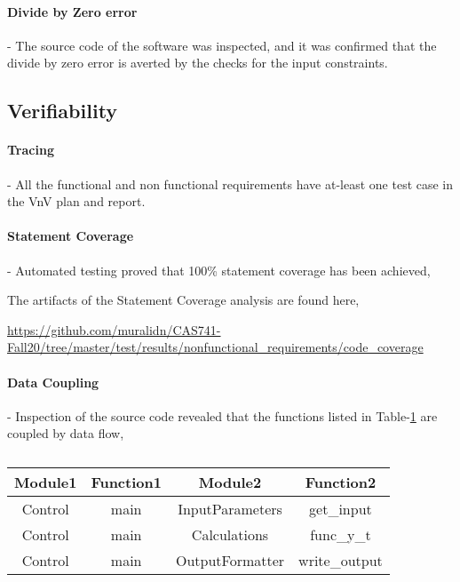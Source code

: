 \documentclass[12pt, titlepage]{article}
\begin{document}
\paragraph{Divide by Zero error} - The source code of the \progname{} software was 
inspected, and it was confirmed that the divide by zero error is averted by the checks for the 
input constraints.

\subsection{Verifiability}

\paragraph{Tracing} - All the functional and non functional requirements have at-least 
one test case in the VnV plan and report.

\paragraph{Statement Coverage} - Automated testing proved that 100\% statement
coverage has been achieved,

The artifacts of the Statement Coverage analysis are found here,

 \url{https://github.com/muralidn/CAS741-Fall20/tree/master/test/results/nonfunctional_requirements/code_coverage}

\paragraph{Data Coupling} - Inspection of the source code revealed that the functions listed in Table-\ref{tab:dataCoupling} 
are coupled by data flow,

\begin{table}[]
\caption{}
\label{tab:dataCoupling}
\begin{tabular}{c|c|c|c}
\multicolumn{1}{c|}{Module1} & \multicolumn{1}{c|}{Function1} & Module2         & Function2     \\ \hline
Control                      & main                           & InputParameters & get\_input    \\
Control                      & main                           & Calculations    & func\_y\_t    \\
Control                      & main                           & OutputFormatter & write\_output
\end{tabular}
\end{table}
\end{document}
